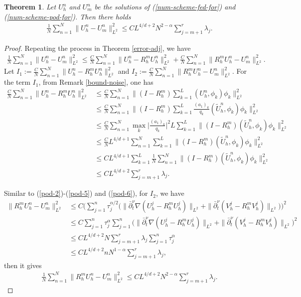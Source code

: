 \documentclass[11pt]{article}
\newtheorem{theorem}{Theorem}
\numberwithin{equation}{section}
\begin{document}
\begin{theorem}\label{main-th1}
Let $U_h^n$ and $U_m^n$ be the solutions of (\ref{num-scheme-fed-for}) and (\ref{num-scheme-pod-for}). Then there holds 
\begin{align*} 
\frac{1}{N}\sum_{n=1}^N\|U_h^n-U_m^n\|_{L^2}^2\leq CL^{4/d+2}N^{2-\alpha}\sum_{j=m+1}^r\lambda_j.    
\end{align*}    
\end{theorem}
\begin{proof} Repeating the process in Theorem \ref{error-adj}, we have
\begin{align}\label{th2-1}
\frac{1}{N}\sum_{n=1}^N\|U_h^n-U_m^n\|_{L^2}^2\leq  \frac{C}{N}\sum_{n=1}^N \|U_h^n-R_h^mU_h^n\|_{L^2}^2+\frac{C}{N}\sum_{n=1}^N \|R_h^mU_h^n-U_m^n\|_{L^2}^2.
\end{align}
Let $I_1:=\frac{C}{N}\sum_{n=1}^N \|U_h^n-R_h^mU_h^n\|_{L^2}^2$ and $I_2:=\frac{C}{N}\sum_{n=1}^N \|R_h^mU_h^n-U_m^n\|_{L^2}^2$.
For the term $I_1$, from Remark \ref{bound-noise}, one has
\begin{align}
\frac{C}{N}\sum_{n=1}^N \|U_h^n-R_h^mU_h^n\|_{L^2}^2\nonumber
&\leq \frac{C}{N}\sum_{n=1}^N \bigg\|(I-R_h^m)\sum_{k=1}^L(U_h^n,\phi_k)\phi_k\bigg\|_{L^2}^2\\ \nonumber
&\leq \frac{C}{N}\sum_{n=1}^N \bigg\|(I-R_h^m)\sum_{k=1}^L\frac{(a_1)_k}{q_k}(\widetilde{U}_h^n,\phi_k)\phi_k\bigg\|_{L^2}^2\\ \nonumber
&\leq \frac{C}{N}\sum_{n=1}^N \max_k\bigg|\frac{(a_1)_k}{q_k}\bigg|^2L\sum_{k=1}^L\bigg\|(I-R_h^m)(\widetilde{U}_h^n,\phi_k)\phi_k\bigg\|_{L^2}^2\\ \nonumber
&\leq \frac{C}{N}L^{4/d+1}\sum_{n=1}^N \sum_{k=1}^L\bigg\|(I-R_h^m)(\widetilde{U}_h^n,\phi_k)\phi_k\bigg\|_{L^2}^2\\ \nonumber
&\leq CL^{4/d+1} \sum_{k=1}^L\frac{1}{N}\sum_{n=1}^N\bigg\|(I-R_h^m)(\widetilde{U}_h^n,\phi_k)\phi_k\bigg\|_{L^2}^2\\ \label{pod-6}
&\leq CL^{4/d+2}\sum_{j=m+1}^r\lambda_j.
\end{align}

Similar to (\ref{pod-2})-(\ref{pod-5}) and (\ref{pod-6}), for $I_2$, we have
\begin{align*}
\|R_h^mU_h^n-U_m^n\|_{L^2}^2
&\leq C\bigg(\sum_{j=1}^{n}\tau_j^{\alpha/2}\big(\|\bar\partial_t^\nu \nabla (U_h^j-R_h^mU_h^j)\|_{L^2}+\|\bar\partial_t^\nu (V_h^j-R_h^mV_h^j)\|_{L^2}\big)\bigg)^2\\
&\leq C\sum_{j=1}^{n}\tau_j^{\alpha}\sum_{j=1}^{n}\bigg(\|\bar\partial_t^\nu \nabla (U_h^j-R_h^mU_h^j)\|_{L^2}+\|\bar\partial_t^\nu (V_h^j-R_h^mV_h^j)\|_{L^2}\bigg)^2\\
&\leq CL^{4/d+2}N\sum_{j=m+1}^r\lambda_j\sum_{j=1}^{n}\tau_j^{\alpha}\\
&\leq CL^{4/d+2}nN^{1-\alpha}\sum_{j=m+1}^r\lambda_j,
\end{align*}
then it gives
\begin{align*}
\frac{1}{N}\sum_{n=1}^N\|R_h^mU_h^n-U_m^n\|_{L^2}^2\leq  CL^{4/d+2}N^{2-\alpha}\sum_{j=m+1}^r\lambda_j.
\end{align*}
\end{proof}
\end{document}
